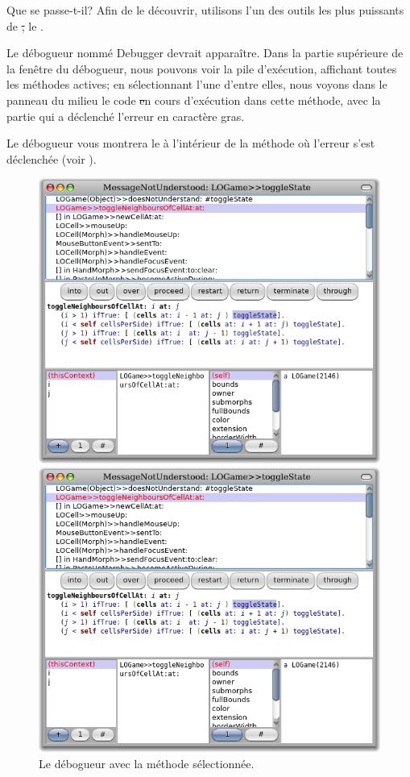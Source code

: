 \documentclass[a4paper,10pt,twoside]{book}
\begin{document}
\noindent
Que se passe-t-il? Afin de le découvrir, utilisons l'un des outils les plus puissants de \st, le .

Le débogueur nommé Debugger devrait apparaître.
Dans la partie supérieure de la fenêtre du débogueur, nous pouvons
voir la pile d'exécution, affichant toutes les méthodes actives; en
sélectionnant l'une d'entre elles, nous voyons dans le panneau du
milieu le code \st en cours d'exécution dans cette méthode, avec
la partie qui a déclenché l'erreur en caractère gras.

Le débogueur vous montrera le  à l'intérieur
de la méthode où l'erreur s'est déclenchée (voir ).

\begin{figure}[ht]
\ifluluelse
	{\centerline {\includegraphics[width=\textwidth]{Debugger}}}
	{\centerline {\includegraphics[scale=0.7]{Debugger}}}
\caption{Le débogueur avec la méthode  sélectionnée.
}
\end{figure}
\end{document}
